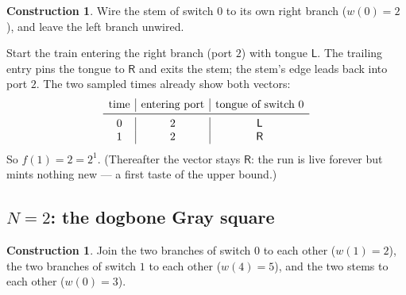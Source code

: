 \documentclass[11pt]{article}
\theoremstyle{definition}
\newtheorem{construction}[theorem]{Construction}
\newcommand{\Left}{\mathsf{L}}
\newcommand{\Right}{\mathsf{R}}
\begin{document}
\begin{construction}\label{con:teardrop}
  Wire the stem of switch $0$ to its own right branch
  ($w(0) = 2$), and leave the left branch unwired.
\end{construction}

\begin{center}
\end{center}

Start the train entering the right branch (port $2$) with tongue
$\Left$.  The trailing entry pins the tongue to $\Right$ and exits the
stem; the stem's edge leads back into port $2$.  The two sampled times
already show both vectors:
\[
\begin{array}{c|c|c}
  \text{time} & \text{entering port} & \text{tongue of switch }0\\\midrule
  0 & 2 & \Left\\
  1 & 2 & \Right
\end{array}
\]
So $f(1) = 2 = 2^1$.  (Thereafter the vector stays $\Right$: the run is
live forever but mints nothing new --- a first taste of the upper bound.)

\subsection{$N = 2$: the dogbone Gray square}

\begin{construction}\label{con:dogbone}
  Join the two branches of switch $0$ to each other ($w(1)=2$), the two
  branches of switch $1$ to each other ($w(4)=5$), and the two stems to
  each other ($w(0)=3$).
\end{construction}

\begin{center}
\end{center}
\end{document}
